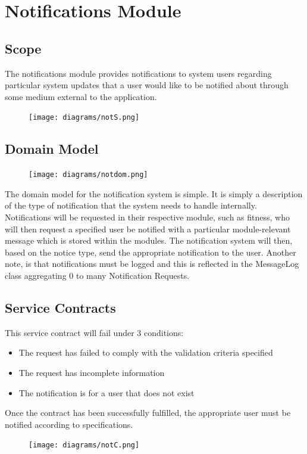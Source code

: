\documentclass[12pt]{article}
\begin{document}
\section{Notifications Module}
\subsection{Scope}
The notifications module provides notifications to system users regarding particular system updates that a user would like to be notified about through some medium external to the application.

\begin{figure}[h]
\centering
\texttt{[image: diagrams/notS.png]}
\end{figure}
\subsection{Domain Model}
\begin{figure}[h]
\centering
\texttt{[image: diagrams/notdom.png]}
\end{figure}
The domain model for the notification system is simple. It is simply a description of the type of notification that the system needs to handle internally. Notifications will be requested in their respective module, such as fitness, who will then request a specified user be notified with a particular module-relevant message which is stored within the modules. The notification system will then, based on the notice type, send the appropriate notification to the user. Another note, is that notifications must be logged and this is reflected in the MessageLog class aggregating 0 to many Notification Requests.

\subsection{Service Contracts}
This service contract will fail under 3 conditions:
\begin{itemize}
\item The request has failed to comply with the validation criteria specified
\item The request has incomplete information
\item The notification is for a user that does not exist
\end{itemize}
Once the contract has been successfully fulfilled, the appropriate user must be notified according to specifications.
\begin{figure}
\centering
\texttt{[image: diagrams/notC.png]}
\end{figure}
\end{document}
